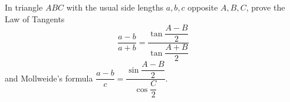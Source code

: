 In triangle $ABC$ with the usual side lengths $a,b,c$ opposite $A,B,C$, prove the Law of Tangents
\[\dfrac{a-b}{a+b}=\dfrac{\tan\dfrac{A-B}2}{\tan\dfrac{A+B}2}\]
and Mollweide's formula $\dfrac{a-b}{c}=\dfrac{\sin\dfrac{A-B}2}{\cos\dfrac C2}$.
